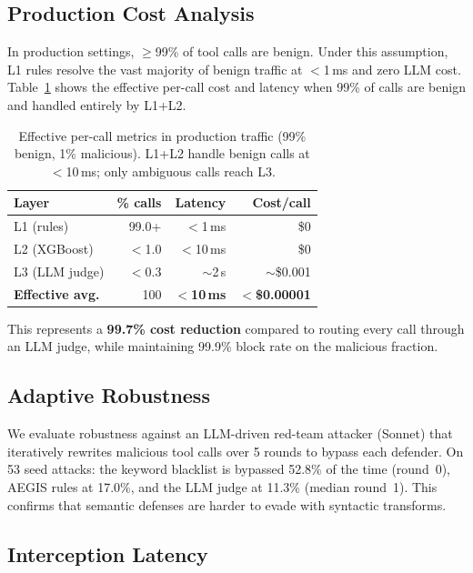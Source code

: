 \documentclass[sigconf,anonymous]{acmart}
\begin{document}
\subsection{Production Cost Analysis}

In production settings, $\ge$99\% of tool calls are benign. Under this assumption, L1 rules resolve the vast majority of benign traffic at $<$1\,ms and zero LLM cost. Table~\ref{tab:production} shows the effective per-call cost and latency when 99\% of calls are benign and handled entirely by L1+L2.

\begin{table}[t]
\centering\small
\caption{Effective per-call metrics in production traffic (99\% benign, 1\% malicious). L1+L2 handle benign calls at $<$10\,ms; only ambiguous calls reach L3.}
\vspace{-0.1in}
\label{tab:production}
\begin{tabular}{lrrr}
\toprule
Layer & \% calls & Latency & Cost/call \\
\midrule
L1 (rules) & 99.0+ & $<$1\,ms & \$0 \\
L2 (XGBoost) & $<$1.0 & $<$10\,ms & \$0 \\
L3 (LLM judge) & $<$0.3 & $\sim$2\,s & $\sim$\$0.001 \\
\midrule
\textbf{Effective avg.} & 100 & $<$\textbf{10\,ms} & $<$\textbf{\$0.00001} \\
\bottomrule
\end{tabular}
\vspace{-0.1in}
\end{table}

This represents a \textbf{99.7\% cost reduction} compared to routing every call through an LLM judge, while maintaining 99.9\% block rate on the malicious fraction.

\subsection{Adaptive Robustness}

We evaluate robustness against an LLM-driven red-team attacker (Sonnet) that iteratively rewrites malicious tool calls over 5 rounds to bypass each defender. On 53 seed attacks: the keyword blacklist is bypassed 52.8\% of the time (round~0), AEGIS rules at 17.0\%, and the LLM judge at 11.3\% (median round~1). This confirms that semantic defenses are harder to evade with syntactic transforms.

\subsection{Interception Latency}
\end{document}
